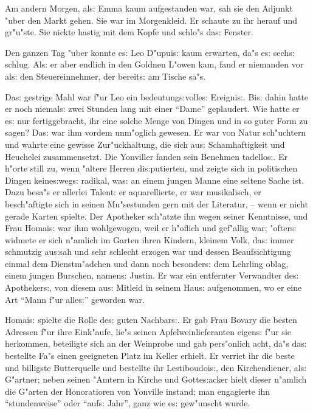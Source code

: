 \documentclass[oneside,12pt]{book}
\newcommand{\s}{s:}%
\begin{document}
\newpage\begin{center}
{\large \so{Dritte{\s} Kapitel}}\bigskip\bigskip
\end{center}

Am andern Morgen, al{\s} Emma kaum aufgestanden war, sah sie den
Adjunkt "uber den Markt gehen. Sie war im Morgenkleid. Er schaute
zu ihr herauf und gr"u"ste. Sie nickte hastig mit dem Kopfe und
schlo"s da{\s} Fenster.

Den ganzen Tag "uber konnte e{\s} Leo D"upui{\s} kaum erwarten,
da"s e{\s} sech{\s} schlug. Al{\s} er aber endlich in den Goldnen
L"owen kam, fand er niemanden vor al{\s} den Steuereinnehmer, der
bereit{\s} am Tische sa"s.

Da{\s} gestrige Mahl war f"ur Leo ein bedeutung{\s}volle{\s}
Ereigni{\s}. Bi{\s} dahin hatte er noch niemal{\s} zwei Stunden
lang mit einer "`Dame"' geplaudert. Wie hatte er e{\s} nur
fertiggebracht, ihr eine solche Menge von Dingen und in so guter
Form zu sagen? Da{\s} war ihm vordem unm"oglich gewesen. Er war
von Natur sch"uchtern und wahrte eine gewisse Zur"uckhaltung, die
sich au{\s} Schamhaftigkeit und Heuchelei zusammensetzt. Die
Yonviller fanden sein Benehmen tadello{\s}. Er h"orte still zu,
wenn "altere Herren di{\s}putierten, und zeigte sich in
politischen Dingen keine{\s}weg{\s} radikal, wa{\s} an einem
jungen Manne eine seltene Sache ist. Dazu besa"s er allerlei
Talent: er aquarellierte, er war musikalisch, er besch"aftigte
sich in seinen Mu"sestunden gern mit der Literatur, -- wenn er
nicht gerade Karten spielte. Der Apotheker sch"atzte ihn wegen
seiner Kenntnisse, und Frau Homai{\s} war ihm wohlgewogen, weil er
h"oflich und gef"allig war; "ofter{\s} widmete er sich n"amlich im
Garten ihren Kindern, kleinem Volk, da{\s} immer schmutzig
au{\s}sah und sehr schlecht erzogen war und dessen Beaufsichtigung
einmal dem Dienstm"adchen und dann noch besonder{\s} dem Lehrling
oblag, einem jungen Burschen, namen{\s} Justin. Er war ein
entfernter Verwandter de{\s} Apotheker{\s}, von diesem au{\s}
Mitleid in seinem Hau{\s} aufgenommen, wo er eine Art "`Mann f"ur
alle{\s}"' geworden war.

Homai{\s} spielte die Rolle de{\s} guten Nachbar{\s}. Er gab Frau
Bovary die besten Adressen f"ur ihre Eink"aufe, lie"s seinen
Apfelweinlieferanten eigen{\s} f"ur sie herkommen, beteiligte sich
an der Weinprobe und gab pers"onlich acht, da"s da{\s} bestellte
Fa"s einen geeigneten Platz im Keller erhielt. Er verriet ihr die
beste und billigste Butterquelle und bestellte ihr
Lestiboudoi{\s}, den Kirchendiener, al{\s} G"artner; neben seinen
"Amtern in Kirche und Gotte{\s}acker hielt dieser n"amlich die
G"arten der Honoratioren von Yonville instand; man engagierte ihn
"`stundenweise"' oder "`auf{\s} Jahr"', ganz wie e{\s} gew"unscht
wurde.
\end{document}
